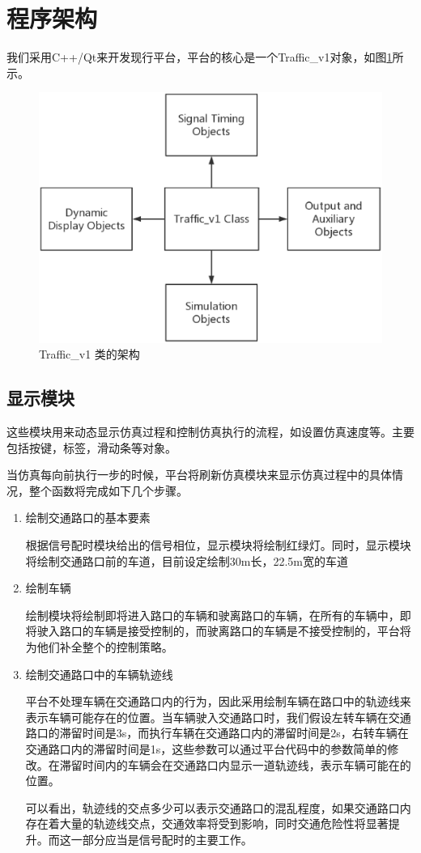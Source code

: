 \documentclass[a4paper,UTF8]{paper}
\begin{document}
\tableofcontents
\clearpage
\section{程序架构}
我们采用C++/Qt来开发现行平台，平台的核心是一个Traffic\_v1对象，如图\ref{UML}所示。

\begin{figure}
\centering
\includegraphics[width=\textwidth]{Diagram.eps}
\caption{Traffic\_v1 类的架构}
\label{UML}
\end{figure}

\subsection{显示模块}
这些模块用来动态显示仿真过程和控制仿真执行的流程，如设置仿真速度等。主要包括按键，标签，滑动条等对象。

当仿真每向前执行一步的时候，平台将刷新仿真模块来显示仿真过程中的具体情况，整个函数将完成如下几个步骤。

\begin{enumerate}
\item 绘制交通路口的基本要素

根据信号配时模块给出的信号相位，显示模块将绘制红绿灯。同时，显示模块将绘制交通路口前的车道，目前设定绘制30m长，22.5m宽的车道

\item 绘制车辆

绘制模块将绘制即将进入路口的车辆和驶离路口的车辆，在所有的车辆中，即将驶入路口的车辆是接受控制的，而驶离路口的车辆是不接受控制的，平台将为他们补全整个的控制策略。

\item 绘制交通路口中的车辆轨迹线

平台不处理车辆在交通路口内的行为，因此采用绘制车辆在路口中的轨迹线来表示车辆可能存在的位置。当车辆驶入交通路口时，我们假设左转车辆在交通路口的滞留时间是3s，而执行车辆在交通路口内的滞留时间是2s，右转车辆在交通路口内的滞留时间是1s，这些参数可以通过平台代码中的参数简单的修改。在滞留时间内的车辆会在交通路口内显示一道轨迹线，表示车辆可能在的位置。

可以看出，轨迹线的交点多少可以表示交通路口的混乱程度，如果交通路口内存在着大量的轨迹线交点，交通效率将受到影响，同时交通危险性将显著提升。而这一部分应当是信号配时的主要工作。
\end{enumerate}
\end{document}
